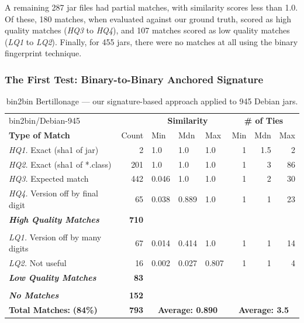 A remaining 287 jar files had partial matches, with similarity scores less
than 1.0.  Of these, 180 matches, when evaluated against our ground truth,
scored as high quality matches (\emph{HQ3} to \emph{HQ4}), and 107 matches
scored as low quality matches (\emph{LQ1} to \emph{LQ2}).  Finally, for 455
jars, there were no matches at all using the binary fingerprint technique.


\subsubsection{The First Test: Binary-to-Binary Anchored Signature}

\begin{table}[h]
  \centering
\begin{tabular}[htbp]{l|r|lll|rrr}
  bin2bin/Debian-945         &              & \multicolumn{3}{c|}{\textbf{Similarity}}  & \multicolumn{3}{c}{\textbf{\# of Ties}} \\
  \textbf{Type of Match}     & Count        & Min   & Mdn    & Max   & Min  & Mdn  & Max  \\
  \hline
  \emph{HQ1.} Exact (sha1 of jar)        &   2          & 1.0   & 1.0    & 1.0   & 1    & 1.5  &  2   \\
  \emph{HQ2.} Exact (sha1 of *.class)    & 201          & 1.0   & 1.0    & 1.0   & 1    & 3    & 86   \\
  \emph{HQ3.} Expected match             & 442          & 0.046 & 1.0    & 1.0   & 1    & 2    & 30   \\
  \emph{HQ4.} Version off by final digit &  65          & 0.038 & 0.889  & 1.0   & 1    & 1    & 23   \\
  \emph{\textbf{High Quality Matches}}   & \textbf{710} &       &        &       &      &      &      \\
& & & & & & & \\
  \emph{LQ1.} Version off by many digits &  67          & 0.014 & 0.414  & 1.0   & 1    & 1    & 14   \\
  \emph{LQ2.} Not useful                 &  16          & 0.002 & 0.027  & 0.807 & 1    & 1    &  4   \\
  \emph{\textbf{Low Quality Matches}}    & \textbf{83}  &       &        &       &      &      &      \\
& & & & & & & \\
  \emph{\textbf{No Matches}}             & \textbf{152} &       &        &       &      &      &     \\
  \hline
  \textbf{Total Matches:} \hspace{3em}    \textbf{(84\%)} &  \textbf{793}   & \multicolumn{3}{c|}{\textbf{Average: 0.890}}  & \multicolumn{3}{c}{\textbf{Average: 3.5}} \\
\end{tabular}
  \caption{bin2bin Bertillonage --- our signature-based approach applied to
    945 Debian jars.} 
  \label{tab:debianBin2Bin}
\end{table}


